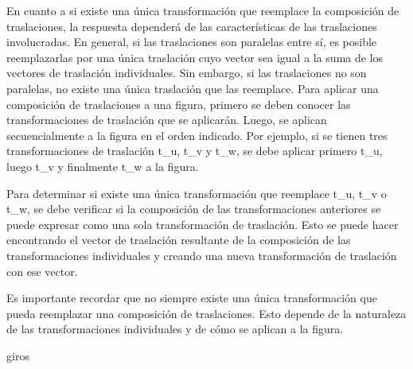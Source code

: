 \documentclass{article}
\begin{document}
En cuanto a si existe una única transformación que reemplace la composición de traslaciones, la respuesta dependerá de las características de las traslaciones involucradas. En general, si las traslaciones son paralelas entre sí, es posible reemplazarlas por una única traslación cuyo vector sea igual a la suma de los vectores de traslación individuales. Sin embargo, si las traslaciones no son paralelas, no existe una única traslación que las reemplace.
Para aplicar una composición de traslaciones a una figura, primero se deben conocer las transformaciones de traslación que se aplicarán. Luego, se aplican secuencialmente a la figura en el orden indicado. Por ejemplo, si se tienen tres transformaciones de traslación t\_u, t\_v y t\_w, se debe aplicar primero t\_u, luego t\_v y finalmente t\_w a la figura.

Para determinar si existe una única transformación que reemplace t\_u, t\_v o t\_w, se debe verificar si la composición de las transformaciones anteriores se puede expresar como una sola transformación de traslación. Esto se puede hacer encontrando el vector de traslación
resultante de la composición de las transformaciones individuales y creando una nueva transformación de traslación con ese vector.

Es importante recordar que no siempre existe una única transformación que pueda reemplazar una composición de traslaciones. Esto depende de la naturaleza de las transformaciones individuales y de cómo se aplican a la figura.


{\large giros}
\end{document}
